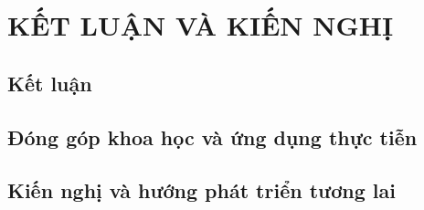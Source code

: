 \chapter{KẾT LUẬN VÀ KIẾN NGHỊ}
\section{Kết luận}
\section{Đóng góp khoa học và ứng dụng thực tiễn}
\section{Kiến nghị và hướng phát triển tương lai}